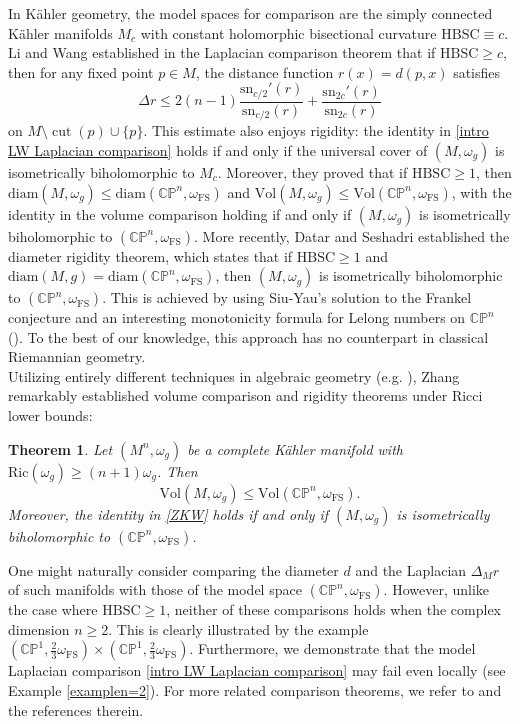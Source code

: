 \documentclass[12pt,reqno]{amsart}
\theoremstyle{plain}
\newtheorem{thm}{Theorem}[section]
\theoremstyle{definition}
\newcommand{\btheorem}{\begin{thm}}
\newcommand{\etheorem}{\end{thm}}
\newcommand{\beq}{\begin{equation}}
\newcommand{\eeq}{\end{equation}}
\renewcommand{\>}{\rightarrow}
\newcommand{\C}{{\mathbb C}}
\renewcommand{\P}{{\mathbb P}}
\numberwithin{equation}{section} %
\newcommand{\om}{\omega}
\renewcommand{\leq}{\leqslant}
\renewcommand{\geq}{\geqslant}
\begin{document}
In K\"ahler geometry, the model spaces for comparison are the simply connected K\"ahler manifolds $M_c$ with constant holomorphic bisectional curvature $\mathrm{HBSC}\equiv c$.
Li and Wang  established in \cite{LW05} the Laplacian comparison theorem that if $\mathrm{HBSC}\geq c$, then for any fixed point $p \in M$, the distance function $r(x) = d(p,x)$ satisfies
\begin{equation}
\Delta r\leq 2(n-1)\frac{\mathrm{sn}_{c/2}'(r)}{\mathrm{sn}_{c/2}(r)}+\frac{\mathrm{sn}_{2c}'(r)}{\mathrm{sn}_{2c}(r)}
\label{intro LW Laplacian comparison}
\end{equation}
on $M \setminus \operatorname{cut}(p) \cup \{p\}$. This estimate also enjoys rigidity: the identity in \eqref{intro LW Laplacian comparison} holds if and only if the universal cover of $(M,\om_g)$ is isometrically biholomorphic to $M_c$.
Moreover, they proved that if $\mathrm{HBSC}\geq 1$, then $\mathrm{diam}(M,\om_g)\leq \mathrm{diam}(\C\P^n, \omega_{\mathrm{FS}})$ and $\mathrm{Vol}(M,\om_g)\leq \mathrm{Vol}(\C\P^n, \omega_{\mathrm{FS}})$, with the identity in the volume comparison holding if and only if $(M, \omega_g)$ is isometrically biholomorphic to $(\C\P^n, \omega_{\mathrm{FS}})$. More recently, Datar and Seshadri \cite{DS23} established the diameter rigidity theorem, which states that if $\mathrm{HBSC}\geq 1$ and $\mathrm{diam}(M,g)=\mathrm{diam}(\C\P^n, \omega_{\mathrm{FS}})$, then $(M,\omega_g)$ is isometrically biholomorphic to $(\C\P^n,\omega_{\mathrm{FS}})$. This is achieved by using Siu-Yau's solution to the Frankel conjecture \cite{SY80} and an interesting monotonicity formula for Lelong numbers on $\C\P^n$ (\cite{Lot21}).
To the best of our knowledge, this approach has no counterpart in classical Riemannian geometry.\\


 Utilizing entirely different techniques in algebraic geometry (e.g. \cite{Fuj18}), Zhang \cite{Zha22} remarkably established volume comparison and rigidity theorems under Ricci lower bounds:

\btheorem\label{Zhang} Let $(M^n,\omega_g)$ be a complete K\"ahler manifold with $\mathrm{Ric}(\omega_g) \geq (n+1)\omega_g$. Then
 \beq \mathrm{Vol}(M,\omega_g)\leq \mathrm{Vol}(\C\P^n, \omega_{\mathrm{FS}}).\label{ZKW}\eeq
Moreover, the identity in \eqref{ZKW} holds if and only if $(M,\omega_g)$ is isometrically biholomorphic to  $(\C\P^n, \omega_{\mathrm{FS}})$.
\etheorem

\noindent
One might naturally consider comparing the diameter $d$ and the Laplacian $\Delta_M r$ of such manifolds with those of the model space $(\C\P^n, \omega_{\mathrm{FS}})$.  However, unlike the case where $\mathrm{HBSC}\geq 1$,  neither of these comparisons holds when the complex dimension $n\geq 2$. This is clearly illustrated by the example  $\left(\C\P^{1},\frac{2}{3}\om_{\mathrm{FS}}\right)\times \left(\C\P^{1},\frac{2}{3}\om_{\mathrm{FS}}\right).$  Furthermore, we demonstrate that the model Laplacian comparison \eqref{intro LW Laplacian comparison}  may fail even locally (see Example \ref{examplen=2}). For more related comparison theorems, we refer to \cite{LW05,Mun09, Liu11, TY12, Liu14, LY18, NZ18, Zhu22, CLZ24+, XY24+, Yang25+} and the references therein.\\
\end{document}
